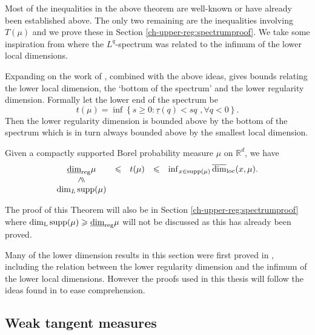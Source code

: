 Most of the inequalities in the above theorem are well-known or have already been established above.  The only two remaining are the inequalities involving $T(\mu)$ and we prove these in Section \ref{ch-upper-reg:spectrumproof}. We take some inspiration from \cite{fraser-jordan} where the $L^q$-spectrum was related to the infimum of the lower local dimensions.


Expanding on the work of \cite{fraser-jordan}, combined with the above ideas, gives bounds relating the lower local dimension, the `bottom of the spectrum' and the lower regularity dimension. Formally let the lower end of the spectrum be
\[
t(\mu) = \inf\left\{ s \ge 0 \colon \underline{\tau}(q) < sq  \, \,, \forall q<0 \right\}.
\]
Then the lower regularity dimension is bounded above by the bottom of the spectrum which is in turn always bounded above by the smallest local dimension.

\begin{theorem} \label{ch-upper-reg:lower-relationships}
	Given a compactly supported Borel probability measure $\mu$ on $\mathbb{R}^d$, we have
	\[
	\begin{array}{ccccc}
    \lrdim \mu & \le & t(\mu) & \le & \inf_ {x\in \mathrm{supp}(\mu)}  \overline{\dim}_{\mathrm{loc}}(x,\mu). \\
    \rotatebox[origin=c]{90}{$\geq$} & &  & & \\
    \dim_\text{\emph{L}} \mathrm{supp}(\mu) & & &  & 
    \end{array}
    \]
\end{theorem}
The proof of this Theorem will also be in Section \ref{ch-upper-reg:spectrumproof} where $\dim_{\textup{L}} \mathrm{supp}(\mu) \geqslant \underline{\dim}_{\textup{reg}} \mu$ will not be discussed as this has already been proved. 

Many of the lower dimension results in this section were first proved in \cite{hare_troscheit}, including the relation between the lower regularity dimension and the infimum of the lower local dimensions. However the proofs used in this thesis will follow the ideas found in \cite{fraser-howroyd2} to ease comprehension.




\subsection{Weak tangent measures}\label{ch-upper-reg:sec:tangent}


